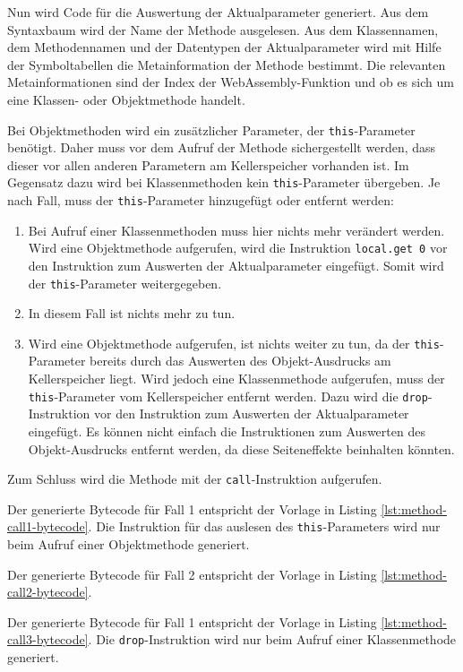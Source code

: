 Nun wird Code für die Auswertung der Aktualparameter generiert. Aus dem Syntaxbaum wird der Name der Methode ausgelesen. Aus dem Klassennamen, dem Methodennamen und der Datentypen der Aktualparameter wird mit Hilfe der Symboltabellen die Metainformation der Methode bestimmt. Die relevanten Metainformationen sind der Index der WebAssembly-Funktion und ob es sich um eine Klassen- oder Objektmethode handelt.

Bei Objektmethoden wird ein zusätzlicher Parameter, der \lstinline{this}-Parameter benötigt. Daher muss vor dem Aufruf der Methode sichergestellt werden, dass dieser vor allen anderen Parametern am Kellerspeicher vorhanden ist. Im Gegensatz dazu wird bei Klassenmethoden kein \lstinline{this}-Parameter übergeben. Je nach Fall, muss der \lstinline{this}-Parameter hinzugefügt oder entfernt werden:

\begin{enumerate}
    \item Bei Aufruf einer Klassenmethoden muss hier nichts mehr verändert werden. Wird eine Objektmethode aufgerufen, wird die Instruktion \lstinline{local.get 0} vor den Instruktion zum Auswerten der Aktualparameter eingefügt. Somit wird der \lstinline{this}-Parameter weitergegeben.
    \item In diesem Fall ist nichts mehr zu tun.
    \item Wird eine Objektmethode aufgerufen, ist nichts weiter zu tun, da der \lstinline{this}-Parameter bereits durch das Auswerten des Objekt-Ausdrucks am Kellerspeicher liegt. Wird jedoch eine Klassenmethode aufgerufen, muss der \lstinline{this}-Parameter vom Kellerspeicher entfernt werden. Dazu wird die \lstinline{drop}-Instruktion vor den Instruktion zum Auswerten der Aktualparameter eingefügt. Es können nicht einfach die Instruktionen zum Auswerten des Objekt-Ausdrucks entfernt werden, da diese Seiteneffekte beinhalten könnten.
\end{enumerate}

Zum Schluss wird die Methode mit der \lstinline{call}-Instruktion aufgerufen.

Der generierte Bytecode für Fall 1 entspricht der Vorlage in Listing \ref{lst:method-call1-bytecode}. Die Instruktion für das auslesen des \lstinline{this}-Parameters wird nur beim Aufruf einer Objektmethode generiert.

Der generierte Bytecode für Fall 2 entspricht der Vorlage in Listing \ref{lst:method-call2-bytecode}.

Der generierte Bytecode für Fall 1 entspricht der Vorlage in Listing \ref{lst:method-call3-bytecode}. Die \lstinline{drop}-Instruktion wird nur beim Aufruf einer Klassenmethode generiert.

